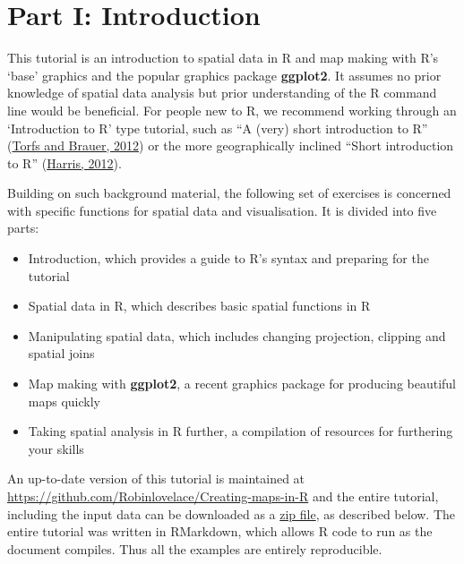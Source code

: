\documentclass[]{article}
\author{}
\date{}
\begin{document}
\section{Part I: Introduction}\label{part-i-introduction}

This tutorial is an introduction to spatial data in R and map making
with R's `base' graphics and the popular graphics package
\textbf{ggplot2}. It assumes no prior knowledge of spatial data analysis
but prior understanding of the R command line would be beneficial. For
people new to R, we recommend working through an `Introduction to R'
type tutorial, such as ``A (very) short introduction to R''
(\href{http://cran.r-project.org/doc/contrib/Torfs+Brauer-Short-R-Intro.pdf}{Torfs
and Brauer, 2012}) or the more geographically inclined ``Short
introduction to R''
(\href{http://www.social-statistics.org/wp-content/uploads/2012/12/intro_to_R1.pdf}{Harris,
2012}).

Building on such background material, the following set of exercises is
concerned with specific functions for spatial data and visualisation. It
is divided into five parts:

\begin{itemize}
\itemsep1pt\parskip0pt
\item
  Introduction, which provides a guide to R's syntax and preparing for
  the tutorial
\item
  Spatial data in R, which describes basic spatial functions in R
\item
  Manipulating spatial data, which includes changing projection,
  clipping and spatial joins
\item
  Map making with \textbf{ggplot2}, a recent graphics package for
  producing beautiful maps quickly
\item
  Taking spatial analysis in R further, a compilation of resources for
  furthering your skills
\end{itemize}

An up-to-date version of this tutorial is maintained at
\href{https://github.com/Robinlovelace/Creating-maps-in-R/blob/master/intro-spatial-rl.pdf}{https://github.com/Robinlovelace/Creating-maps-in-R}
and the entire tutorial, including the input data can be downloaded as a
\href{https://github.com/Robinlovelace/Creating-maps-in-R/archive/master.zip}{zip
file}, as described below. The entire tutorial was written in RMarkdown,
which allows R code to run as the document compiles. Thus all the
examples are entirely reproducible.
\end{document}
